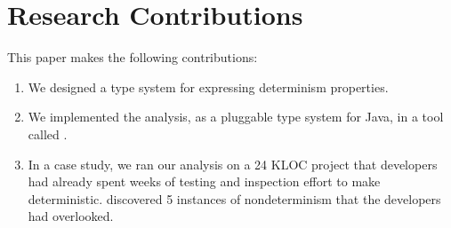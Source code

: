 \section{Research Contributions\label{sec:contributions}}
This paper makes the following contributions:
\begin{enumerate}
  \item We designed a type system for expressing determinism properties.

  \item We implemented the analysis, as a pluggable type system for Java, in a
    tool called \theDeterminismChecker.

  \item In a case study, we ran our analysis on a 24 KLOC project that
    developers had already spent weeks of testing and inspection effort to
    make deterministic.  \TheDeterminismChecker
    discovered 5 instances of nondeterminism that the developers had
    overlooked.
\end{enumerate}


